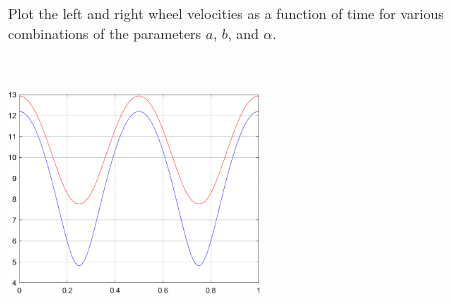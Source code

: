 Plot the left and right wheel velocities as a function of time for various combinations of the
parameters $a$, $b$, and $\alpha$.

\begin{solution}\
\begin{center}
    \includegraphics[width=0.5\textwidth]{img/e2p8.png}
\end{center}
\end{solution}